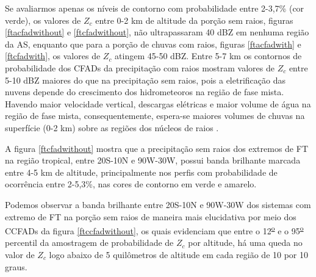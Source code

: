 Se avaliarmos apenas os níveis de contorno com probabilidade entre 2-3,7\% (cor verde), os valores de $Z_c$ entre 0-2 km de altitude da porção sem raios, figuras \ref{ftacfadwithout} e \ref{ftcfadwithout}, não ultrapassaram 40 dBZ em nenhuma região da AS, enquanto que para a porção de chuvas com raios, figuras \ref{ftacfadwith} e \ref{ftcfadwith}, os valores de $Z_c$ atingem 45-50 dBZ. Entre 5-7 km os contornos de probabilidade dos CFADs da precipitação com raios mostram valores de $Z_c$ entre 5-10 dBZ maiores do que na precipitação sem raios, pois a eletrificação das nuvens depende do crescimento dos hidrometeoros na região de fase mista. Havendo maior velocidade vertical, descargas elétricas e maior volume de água na região de fase mista, consequentemente, espera-se maiores volumes de chuvas na superfície (0-2 km) sobre as regiões dos núcleos de raios \cite{Petersen1998}. 





A figura \ref{ftcfadwithout} mostra que a precipitação sem raios dos extremos de FT na região tropical, entre 20S-10N e 90W-30W, possui banda brilhante marcada entre 4-5 km de altitude, principalmente nos perfis com probabilidade de ocorrência entre 2-5,3\%, nas cores de contorno em verde e amarelo. 

Podemos observar a banda brilhante entre 20S-10N e 90W-30W  dos sistemas com  extremo de FT na porção sem raios de maneira mais elucidativa por meio dos CCFADs da figura \ref{ftccfadwithout}, os quais evidenciam que entre o 12\textsuperscript{\underline{o}} e o 95\textsuperscript{\underline{o}} percentil da amostragem de probabilidade de $Z_c$ por altitude, há uma queda no valor de $Z_c$ logo abaixo de 5 quilômetros de altitude em cada região de 10 por 10 graus. 

